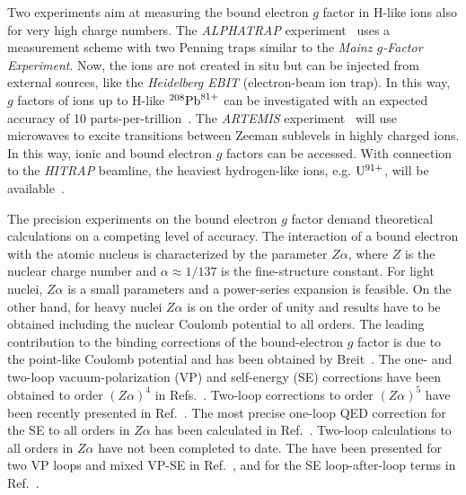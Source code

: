 Two experiments aim at measuring the bound electron $g$ factor in H-like ions also for very high charge numbers. The \textit{ALPHATRAP} experiment~\cite{sturm2017} uses a measurement scheme with two Penning traps similar to the \textit{Mainz $g$-Factor Experiment}. Now, the ions are not created in situ but can be injected from external sources, like the \textit{Heidelberg EBIT} (electron-beam ion trap). In this way, $g$ factors of ions up to H-like $^{208}\rm{Pb}^{81+}$ can be investigated with an expected accuracy of 10 parts-per-trillion~\cite{sturm2017}. The \textit{ARTEMIS} experiment~\cite{vogel2013,sturm2017} will use microwaves to excite transitions between Zeeman sublevels in highly charged ions. In this way, ionic and bound electron $g$ factors can be accessed. With connection to the \textit{HITRAP} beamline, the heaviest hydrogen-like ions, e.g. $\rm{U}^{91+}$, will be available~\cite{vogel2015}.

The precision experiments on the bound electron $g$ factor demand theoretical calculations on a competing level of accuracy. The interaction of a bound electron with the atomic nucleus is characterized by the parameter $Z\alpha$, where $Z$ is the nuclear charge number and $\alpha \approx 1/137$ is the fine-structure constant. For light nuclei, $Z\alpha$ is a small parameters and a power-series expansion is feasible. On the other hand, for heavy nuclei $Z\alpha$ is on the order of unity and results have to be obtained including the nuclear Coulomb potential to all orders. %
The leading contribution to the binding corrections of the bound-electron $g$ factor is due to the point-like Coulomb potential and has been obtained by Breit~\cite{breit1928}.
The one- and two-loop vacuum-polarization (VP) and self-energy (SE) corrections have been obtained to order $(Z\alpha)^4$ in Refs.~\cite{karshenboim2000,Pachucki2004,pachucki2004_err,Pachucki2005}. 
Two-loop corrections to order $(Z\alpha)^5$ have been recently presented in Ref.~\cite{czarnecki2018}.
The most precise one-loop QED correction for the SE to all orders in $Z\alpha$ has been calculated in Ref.~\cite{yerokhin2017}.
Two-loop calculations to all orders in $Z\alpha$ have not been completed to date. The have been presented for two VP loops and mixed VP-SE in Ref.~\cite{yerokhin2013}, and for the SE loop-after-loop terms in Ref.~\cite{sikora2018_arxiv}.


